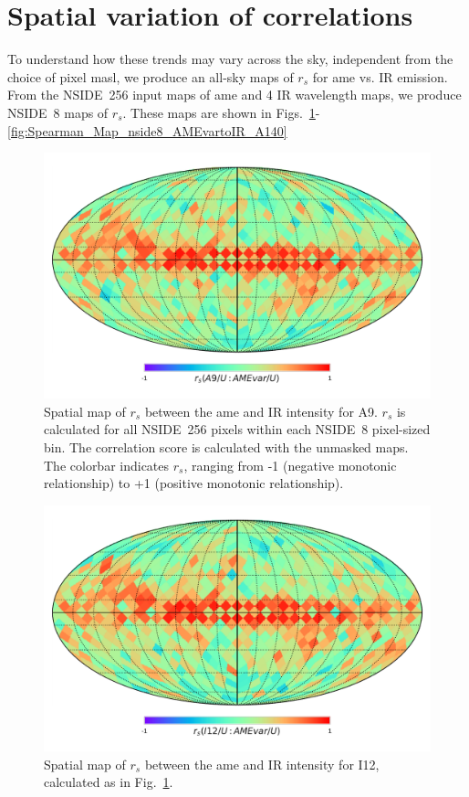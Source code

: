 \section{Spatial variation of correlations}
    To understand how these trends may vary across the sky, independent from the choice of pixel masl, we produce an all-sky maps of $r_{s}$ for \gls{ame} vs. IR emission. From the NSIDE~256 input maps of \gls{ame} and 4 IR wavelength maps, we produce NSIDE~8 maps of $r_{s}$. These maps are shown in Figs.~\ref{fig:Spearman_Map_nside8_AMEvartoIR_A9}-\ref{fig:Spearman_Map_nside8_AMEvartoIR_A140}
      \begin{figure}
        \includegraphics[width=\textwidth/2]{../Plots/Allsky_Corr/Spearman_Map_nside8_A9toAMEvar.pdf}
        \centering
        \caption{Spatial map of $r_{s}$ between the \gls{ame} and IR intensity for A9. $r_{s}$ is calculated for all NSIDE~256 pixels within each NSIDE~8 pixel-sized bin. The correlation score is calculated with the unmasked maps. The colorbar indicates $r_{s}$, ranging from -1 (negative monotonic relationship) to +1 (positive monotonic relationship).}
        \label{fig:Spearman_Map_nside8_AMEvartoIR_A9}
      \end{figure}
      \begin{figure}
        \includegraphics[width=\textwidth/2]{../Plots/Allsky_Corr/Spearman_Map_nside8_I12toAMEvar.pdf}
        \centering
        \caption{Spatial map of $r_{s}$ between the \gls{ame} and IR intensity for I12, calculated as in Fig.~\ref{fig:Spearman_Map_nside8_AMEvartoIR_A9}.}
        \label{fig:Spearman_Map_nside8_AMEvartoIR_I12}
      \end{figure}
